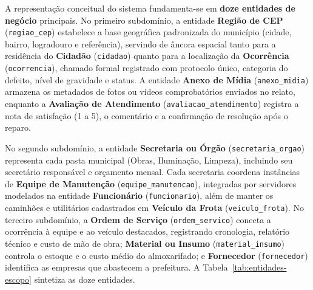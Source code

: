 A representação conceitual do sistema fundamenta-se em \textbf{doze entidades de negócio} principais. No primeiro subdomínio, a entidade \textbf{Região de CEP} (\texttt{regiao\_cep}) estabelece a base geográfica padronizada do município (cidade, bairro, logradouro e referência), servindo de âncora espacial tanto para a residência do \textbf{Cidadão} (\texttt{cidadao}) quanto para a localização da \textbf{Ocorrência} (\texttt{ocorrencia}), chamado formal registrado com protocolo único, categoria do defeito, nível de gravidade e status. A entidade \textbf{Anexo de Mídia} (\texttt{anexo\_midia}) armazena os metadados de fotos ou vídeos comprobatórios enviados no relato, enquanto a \textbf{Avaliação de Atendimento} (\texttt{avaliacao\_atendimento}) registra a nota de satisfação (1 a 5), o comentário e a confirmação de resolução após o reparo.

No segundo subdomínio, a entidade \textbf{Secretaria ou Órgão} (\texttt{secretaria\_orgao}) representa cada pasta municipal (Obras, Iluminação, Limpeza), incluindo seu secretário responsável e orçamento mensal. Cada secretaria coordena instâncias de \textbf{Equipe de Manutenção} (\texttt{equipe\_manutencao}), integradas por servidores modelados na entidade \textbf{Funcionário} (\texttt{funcionario}), além de manter os caminhões e utilitários cadastrados em \textbf{Veículo da Frota} (\texttt{veiculo\_frota}). No terceiro subdomínio, a \textbf{Ordem de Serviço} (\texttt{ordem\_servico}) conecta a ocorrência à equipe e ao veículo destacados, registrando cronologia, relatório técnico e custo de mão de obra; \textbf{Material ou Insumo} (\texttt{material\_insumo}) controla o estoque e o custo médio do almoxarifado; e \textbf{Fornecedor} (\texttt{fornecedor}) identifica as empresas que abastecem a prefeitura. A Tabela~\ref{tab:entidades-escopo} sintetiza as doze entidades.

